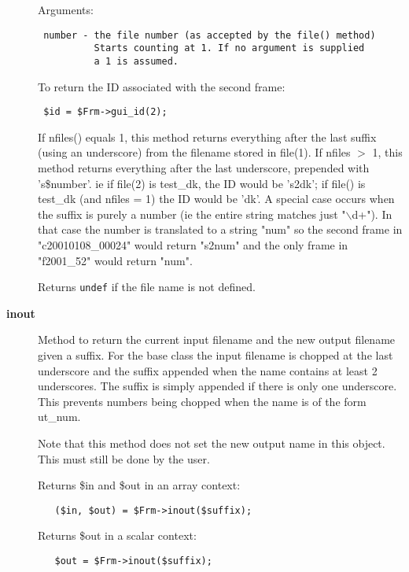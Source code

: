 \begin{description}
Arguments:

\begin{verbatim}
 number - the file number (as accepted by the file() method)
          Starts counting at 1. If no argument is supplied
          a 1 is assumed.
\end{verbatim}


To return the ID associated with the second frame:

\begin{verbatim}
 $id = $Frm->gui_id(2);
\end{verbatim}


If nfiles() equals 1, this method returns everything after the last
suffix (using an underscore) from the filename stored in file(1). If
nfiles $>$ 1, this method returns everything after the last
underscore, prepended with 's\$number'. ie if file(2) is test\_dk, the
ID would be 's2dk'; if file() is test\_dk (and nfiles = 1) the ID would
be 'dk'. A special case occurs when the suffix is purely a number (ie
the entire string matches just "$\backslash$d+"). In that case the number is
translated to a string "num" so the second frame in "c20010108\_00024"
would return "s2num" and the only frame in "f2001\_52" would return
"num".



Returns \texttt{undef} if the file name is not defined.


\item[\textbf{inout}] \mbox{}

Method to return the current input filename and the new output
filename given a suffix.  For the base class the input filename is
chopped at the last underscore and the suffix appended when the name
contains at least 2 underscores. The suffix is simply appended if
there is only one underscore. This prevents numbers being chopped when
the name is of the form ut\_num.



Note that this method does not set the new output name in this
object. This must still be done by the user.



Returns \$in and \$out in an array context:

\begin{verbatim}
   ($in, $out) = $Frm->inout($suffix);
\end{verbatim}


Returns \$out in a scalar context:

\begin{verbatim}
   $out = $Frm->inout($suffix);
\end{verbatim}



\end{description}
